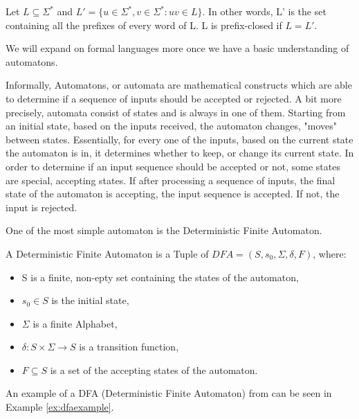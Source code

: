 \begin{definition}
	Let $L\subseteq\Sigma^*$ and $L' = \{u\in\Sigma^*, v\in\Sigma^* : uv\in L\}$. In other words, L' is the set containing all the prefixes of every word of L. L is prefix-closed if $L = L'$.
\end{definition}

We will expand on formal languages more once we have a basic understanding of automatons. 

Informally, Automatons, or automata are mathematical constructs which are able to determine if a sequence of inputs should be accepted or rejected. A bit more precisely, automata consist of states and is always in one of them. Starting from an initial state, based on the inputs received, the automaton changes, "moves" between states. Essentially, for every one of the inputs, based on the current state the automaton is in, it determines whether to keep, or change its current state. In order to determine if an input sequence should be accepted or not, some states are special, accepting states. If after processing a sequence of inputs, the final state of the automaton is accepting, the input sequence is accepted. If not, the input is rejected.


One of the most simple automaton is the Deterministic Finite Automaton.

\begin{definition}
	A Deterministic Finite Automaton is a Tuple of $ DFA=(S,s_{0},\Sigma,\delta,F) $, where: 
	\begin{itemize}
		\item S is a finite, non-epty set containing the states of the automaton,
		\item $s_{0} \in S$ is the initial state,
		\item $\Sigma$ is a finite Alphabet,
		\item $\delta: S\times \Sigma \to S$ is a transition function,
		\item $F\subseteq S$ is a set of the accepting states of the automaton. 
	\end{itemize}
\end{definition}


An example of a DFA (Deterministic Finite Automaton) from\cite{Steffen2011} can be seen in Example \ref{ex:dfaexample}.

